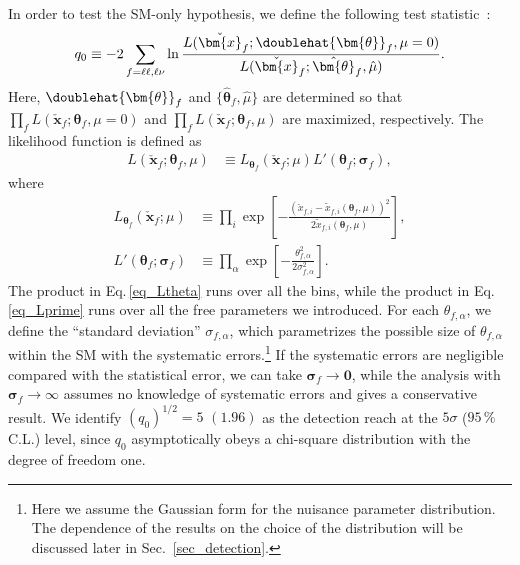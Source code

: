 \documentclass[12pt,twoside,book]{article}
\begin{document}
In order to test the SM-only hypothesis, we
define the following test statistic~\cite{Cowan:2010js}:
\begin{align}
  q_0 \equiv -2 \sum_{f=\ell \ell, \ell \nu} \ln \frac
  {L(\check{\bm{x}}_f ; \doublehat{\bm{\theta}}_f, \mu=0)}
  {L(\check{\bm{x}}_f ; \hat{\bm{\theta}}_f, \hat{\mu})}.
  \label{eq_q0}
\end{align}
Here, $\doublehat{\bm{\theta}}_f$ and $\{ \hat{\bm{\theta}}_f, \hat{\mu}
\}$ are determined so that
$\prod_f L(\check{\bm{x}}_f ; \bm{\theta}_f, \mu=0)$ and
$\prod_f L(\check{\bm{x}}_f ; \bm{\theta}_f, \mu)$ are maximized, respectively.
The likelihood function is defined as
\begin{align}
 L(\check{\bm{x}}_f ; \bm{\theta}_f, \mu) &\equiv
 L_{\bm{\theta}_f} (\check{\bm{x}}_f ; \mu) L'(\bm{\theta}_f ; \bm{\sigma}_f),\label{eq_L}
\end{align}
where
\begin{align}
 L_{\bm{\theta}_f} (\check{\bm{x}}_f ; \mu) &\equiv
 \prod_{i} \exp \left[
 -\frac{(\check{x}_{f,i} - \tilde{x}_{f,i} (\bm{\theta}_f, \mu))^2}
 {2 \tilde{x}_{f,i} (\bm{\theta}_f, \mu)}
 \right],\label{eq_Ltheta}\\
 L'(\bm{\theta}_f ; \bm{\sigma}_f) &\equiv
 \prod_{\alpha} \exp \left[
 - \frac{\theta_{f,\alpha}^2}{2\sigma_{f,\alpha}^2}
 \right].\label{eq_Lprime}
\end{align}
The product in Eq.\,\eqref{eq_Ltheta} runs over all the bins, while
the product in Eq.\,\eqref{eq_Lprime} runs over all the free
parameters we introduced.  For each $\theta_{f, \alpha}$, we define
the ``standard deviation'' $\sigma_{f, \alpha}$, which parametrizes
the possible size of $\theta_{f, \alpha}$ within the SM with the
systematic errors.\footnote{
Here we assume the Gaussian form for the nuisance parameter
distribution.  The dependence of the results on the choice of the
distribution will be discussed later in Sec.~\ref{sec_detection}.
}  If the systematic errors are negligible compared
with the statistical error, we can take $\bm{\sigma}_f \to \bm{0}$,
while the analysis with $\bm{\sigma}_f \to \infty$ assumes no
knowledge of systematic errors and gives a conservative result.  We
identify $( q_0 )^{1/2} = 5$ $(1.96)$ as the detection reach at the
$5\sigma$ ($95\,\%$ C.L.) level, since $q_0$ asymptotically obeys a
chi-square distribution with the degree of freedom one.
\end{document}
